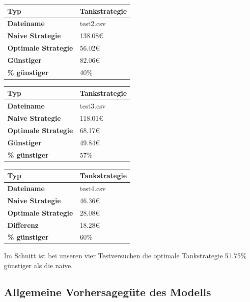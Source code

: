 \documentclass[
ngerman          %
,a4paper          %
,11pt
,pdftex
]{report}
\begin{document}
\begin{table}[H]
	\centering
	\begin{tabular}{l l}
		\textbf{Typ} & \textbf{Tankstrategie} \\ 
		\hline
		\hline
		\textbf{Dateiname} & test2.csv \\
        \textbf{Naive Strategie} & 138.08\euro{} \\
        \textbf{Optimale Strategie} & 56.02\euro{} \\
  		\textbf{Günstiger} & 82.06\euro{} \\
        \textbf{\% günstiger} & 40\% \\
		\hline 
	\end{tabular}
\end{table} 

\begin{table}[H]
	\centering
	\begin{tabular}{l l}
		\textbf{Typ} & \textbf{Tankstrategie} \\ 
		\hline
		\hline
		\textbf{Dateiname} & test3.csv \\
        \textbf{Naive Strategie} & 118.01\euro{} \\
        \textbf{Optimale Strategie} & 68.17\euro{} \\
  		\textbf{Günstiger} & 49.84\euro{} \\
        \textbf{\% günstiger} & 57\% \\
		\hline 
	\end{tabular}
\end{table} 

\begin{table}[H]
	\centering
	\begin{tabular}{l l}
		\textbf{Typ} & \textbf{Tankstrategie} \\ 
		\hline
		\hline
		\textbf{Dateiname} & test4.csv \\
        \textbf{Naive Strategie} & 46.36\euro{} \\
        \textbf{Optimale Strategie} & 28.08\euro{} \\
  		\textbf{Differenz} & 18.28\euro{} \\
        \textbf{\% günstiger} & 60\% \\
		\hline 
	\end{tabular}
\end{table} 

Im Schnitt ist bei unseren vier Testversuchen die optimale Tankstrategie 51.75\% günstiger als die naive.

\subsection{Allgemeine Vorhersagegüte des Modells}
\end{document}
